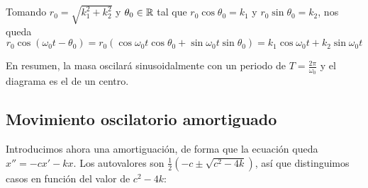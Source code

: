 \documentclass[../ecuaciones_diferenciales.tex]{subfiles}
\begin{document}
Tomando \(r_0 = \sqrt{k_1^2+k_2^2}\) y \(\theta_0 \in \mathbb{R}\) tal que \(r_0 \cos
\theta_0 = k_1\) y \(r_0 \sin \theta_0 = k_2\), nos queda
\[r_0 \cos (\omega_0 t - \theta_0) = r_0(\cos \omega_0 t \cos \theta_0 + \sin
	\omega_0 t \sin \theta_0) = k_1 \cos \omega_0 t + k_2 \sin \omega_0 t\]

En resumen, la masa oscilará sinusoidalmente con un periodo de \(T =
\frac{2\pi}{\omega_0}\) y el diagrama es el de un centro.

\subsection{Movimiento oscilatorio amortiguado}
Introducimos ahora una amortiguación, de forma que la ecuación queda
\(x'' = - cx' - kx\). Los autovalores son \(\frac{1}{2}(-c \pm \sqrt{c^2-4k})\), así
que distinguimos casos en función del valor de \(c^2-4k\):
\end{document}
